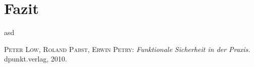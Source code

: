 \documentclass[a4paper,DIV=calc,ngerman]{scrartcl}
\begin{document}
\section{Fazit}
\label{sec:Fazit}
asd




\begin{thebibliography}{------}
\label{sec:Literatur}

 \textsc{Peter Löw, Roland Pabst, Erwin Petry}: {\em Funktionale Sicherheit in der Praxis.} dpunkt.verlag, 2010.

\end{thebibliography}
\end{document}
